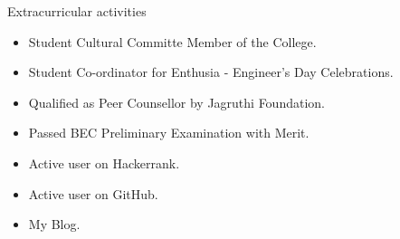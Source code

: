 \documentclass{resume}
\begin{document}
\begin{rSection}{Extracurricular activities}
\begin{itemize}
\renewcommand{\labelitemi}{$\bullet$}
\item Student Cultural Committe Member of the College.
\item Student Co-ordinator for Enthusia - Engineer's Day Celebrations.
\item Qualified as Peer Counsellor by Jagruthi Foundation.
\item Passed BEC Preliminary Examination with Merit.
\item Active user on Hackerrank. \href{https://www.hackerrank.com/rpavani1998}{\color{blue}{Hackerrank Profile: rpavani1998}}
\item Active user on GitHub. \href{https://github.com/rpavani1998}{\color{blue}{GitHub Profile: rpavani1998}}
\item My Blog. \href{http://rpavani1998.github.io/}{\color{blue}{rpavani1998.github.io}}
\end{itemize}


\end{rSection}
\end{document}
